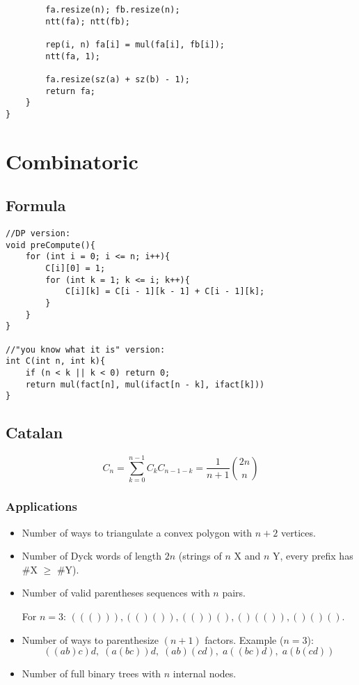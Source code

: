 \documentclass[11pt,a4paper]{article}
\begin{document}
\begin{multicols*}{2}
\begin{lstlisting}
        fa.resize(n); fb.resize(n);
        ntt(fa); ntt(fb);

        rep(i, n) fa[i] = mul(fa[i], fb[i]);
        ntt(fa, 1);

        fa.resize(sz(a) + sz(b) - 1);
        return fa;
    }
}
\end{lstlisting}

\section{Combinatoric}
\subsection{Formula}
\begin{lstlisting}
//DP version:
void preCompute(){
    for (int i = 0; i <= n; i++){
        C[i][0] = 1;
        for (int k = 1; k <= i; k++){
            C[i][k] = C[i - 1][k - 1] + C[i - 1][k];
        }
    }
}

//"you know what it is" version:
int C(int n, int k){
    if (n < k || k < 0) return 0;
    return mul(fact[n], mul(ifact[n - k], ifact[k])) 
}
\end{lstlisting}

\subsection{Catalan}
\[
C_n = \sum_{k=0}^{n-1} C_k C_{n-1-k} 
    = \frac{1}{n+1} \binom{2n}{n}
\]

\subsubsection*{Applications}
\begin{itemize}
  \item Number of ways to triangulate a convex polygon with $n+2$ vertices.
  \item Number of Dyck words of length $2n$ (strings of $n$ X and $n$ Y, every prefix has \#X $\ge$ \#Y).
  \item Number of valid parentheses sequences with $n$ pairs. 
  
  For $n=3$: \(((())), (()()), (())(), ()(()), ()()()\).
  \item Number of ways to parenthesize $(n+1)$ factors.  
        Example ($n=3$): 
        \[ ((ab)c)d,\; (a(bc))d,\; (ab)(cd),\; a((bc)d),\; a(b(cd)) \]
  \item Number of full binary trees with $n$ internal nodes.
\end{itemize}


\end{multicols*}
\end{document}
